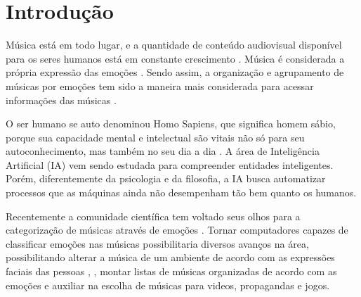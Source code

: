 \documentclass[
	12pt,				%
	openright,			%
	oneside,
	a4paper,			%
	english,			%
	french,				%
	spanish,			%
	brazil				%
	]{abntex2}
\begin{document}
\tableofcontents*
\cleardoublepage


\renewcommand{\listfigurename}{Lista de Figuras}
\listoffigures
\cleardoublepage

\textual

\chapter[Introdução]{Introdução}



%
%
%

Música está em todo lugar, e a quantidade de conteúdo audiovisual disponível para os seres humanos está em constante crescimento \cite{yang2012machine}. Música é considerada a própria expressão das emoções \cite{kim2010music}. Sendo assim, a organização e agrupamento de músicas por emoções tem sido a maneira mais considerada para acessar informações das músicas \cite{huron2000perceptual}.

O ser humano se auto denominou Homo Sapiens, que significa homem sábio, porque sua capacidade mental e intelectual são vitais não só para seu autoconhecimento, mas também no seu dia a dia \cite{russell2016artificial}. A área de Inteligência Artificial (IA) vem sendo estudada para compreender entidades inteligentes. Porém, diferentemente da psicologia e da filosofia, a IA busca automatizar processos que as máquinas ainda não desempenham tão bem quanto os humanos\cite{russell2016artificial}.

Recentemente a comunidade científica tem voltado seus olhos para a categorização de músicas através de emoções \cite{huq2010automated}. Tornar computadores capazes de classificar emoções nas músicas possibilitaria diversos avanços na área, possibilitando alterar a música de um ambiente de acordo com as expressões faciais das pessoas \cite{kim2008emotion}, \cite{anderson2006real}, montar listas de músicas organizadas de acordo com as emoções e auxiliar na escolha de músicas para videos, propagandas e jogos.
\end{document}
